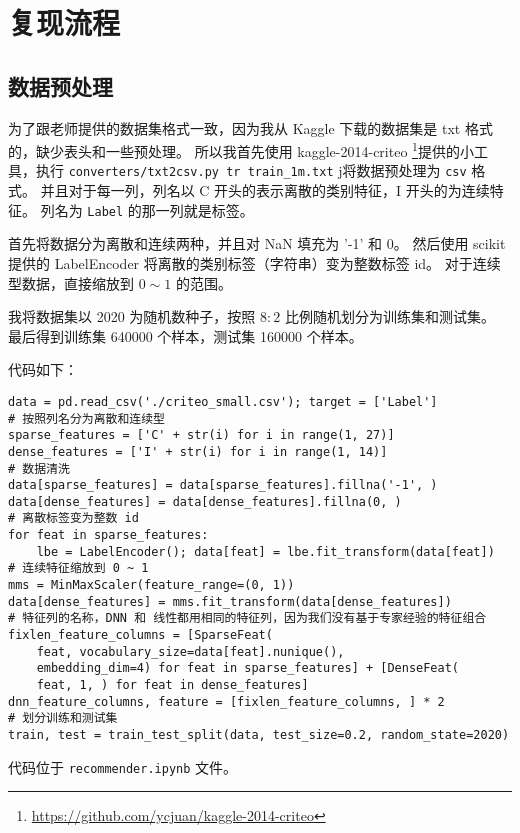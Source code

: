 \documentclass[degree=project,degree-type=project,cjk-font=noto]{thuthesis}
\begin{document}
\chapter{复现流程}

\section{数据预处理}

为了跟老师提供的数据集格式一致，因为我从 Kaggle 下载的数据集是 txt 格式的，缺少表头和一些预处理。
所以我首先使用 kaggle-2014-criteo \footnote{\url{https://github.com/ycjuan/kaggle-2014-criteo}}提供的小工具，执行 \texttt{converters/txt2csv.py tr train\_1m.txt} j将数据预处理为 \texttt{csv} 格式。
并且对于每一列，列名以 C 开头的表示离散的类别特征，I 开头的为连续特征。
列名为 \texttt{Label} 的那一列就是标签。

首先将数据分为离散和连续两种，并且对 NaN 填充为 '-1' 和 0。
然后使用 scikit 提供的 LabelEncoder 将离散的类别标签（字符串）变为整数标签 id。
对于连续型数据，直接缩放到 $0 \sim 1$ 的范围。

我将数据集以 2020 为随机数种子，按照 $8 : 2$ 比例随机划分为训练集和测试集。
最后得到训练集 640000 个样本，测试集 160000 个样本。

代码如下：

  \begin{verbatim}
data = pd.read_csv('./criteo_small.csv'); target = ['Label']
# 按照列名分为离散和连续型
sparse_features = ['C' + str(i) for i in range(1, 27)]
dense_features = ['I' + str(i) for i in range(1, 14)]
# 数据清洗
data[sparse_features] = data[sparse_features].fillna('-1', )
data[dense_features] = data[dense_features].fillna(0, )
# 离散标签变为整数 id
for feat in sparse_features:
    lbe = LabelEncoder(); data[feat] = lbe.fit_transform(data[feat])
# 连续特征缩放到 0 ~ 1
mms = MinMaxScaler(feature_range=(0, 1))
data[dense_features] = mms.fit_transform(data[dense_features])
# 特征列的名称，DNN 和 线性都用相同的特征列，因为我们没有基于专家经验的特征组合
fixlen_feature_columns = [SparseFeat(
    feat, vocabulary_size=data[feat].nunique(),
    embedding_dim=4) for feat in sparse_features] + [DenseFeat(
    feat, 1, ) for feat in dense_features]
dnn_feature_columns, feature = [fixlen_feature_columns, ] * 2
# 划分训练和测试集
train, test = train_test_split(data, test_size=0.2, random_state=2020)
  \end{verbatim}

代码位于 \texttt{recommender.ipynb} 文件。
\end{document}
